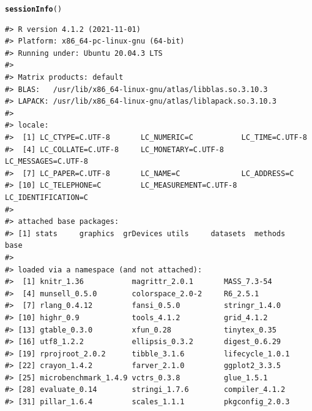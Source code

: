 \documentclass{article}\usepackage[]{graphicx}\usepackage[]{color}
\makeatletter
\newcommand{\hlstd}[1]{\textcolor[rgb]{0.345,0.345,0.345}{#1}}%
\newcommand{\hlkwd}[1]{\textcolor[rgb]{0.737,0.353,0.396}{\textbf{#1}}}%
\newenvironment{kframe}{%
 \def\at@end@of@kframe{}%
 \ifinner\ifhmode%
  \def\at@end@of@kframe{\end{minipage}}%
  \begin{minipage}{\columnwidth}%
 \fi\fi%
 \def\FrameCommand##1{\hskip\@totalleftmargin \hskip-\fboxsep
 \colorbox{shadecolor}{##1}\hskip-\fboxsep
     \hskip-\linewidth \hskip-\@totalleftmargin \hskip\columnwidth}%
 \MakeFramed {\advance\hsize-\width
   \@totalleftmargin\z@ \linewidth\hsize
   \@setminipage}}%
 {\par\unskip\endMakeFramed%
 \at@end@of@kframe}
\newenvironment{knitrout}{}{} %
\makeatother
\begin{document}
\begin{knitrout}
\color{fgcolor}\begin{kframe}
\begin{alltt}
\hlkwd{sessionInfo}\hlstd{()}
\end{alltt}
\begin{verbatim}
#> R version 4.1.2 (2021-11-01)
#> Platform: x86_64-pc-linux-gnu (64-bit)
#> Running under: Ubuntu 20.04.3 LTS
#> 
#> Matrix products: default
#> BLAS:   /usr/lib/x86_64-linux-gnu/atlas/libblas.so.3.10.3
#> LAPACK: /usr/lib/x86_64-linux-gnu/atlas/liblapack.so.3.10.3
#> 
#> locale:
#>  [1] LC_CTYPE=C.UTF-8       LC_NUMERIC=C           LC_TIME=C.UTF-8       
#>  [4] LC_COLLATE=C.UTF-8     LC_MONETARY=C.UTF-8    LC_MESSAGES=C.UTF-8   
#>  [7] LC_PAPER=C.UTF-8       LC_NAME=C              LC_ADDRESS=C          
#> [10] LC_TELEPHONE=C         LC_MEASUREMENT=C.UTF-8 LC_IDENTIFICATION=C   
#> 
#> attached base packages:
#> [1] stats     graphics  grDevices utils     datasets  methods   base     
#> 
#> loaded via a namespace (and not attached):
#>  [1] knitr_1.36           magrittr_2.0.1       MASS_7.3-54         
#>  [4] munsell_0.5.0        colorspace_2.0-2     R6_2.5.1            
#>  [7] rlang_0.4.12         fansi_0.5.0          stringr_1.4.0       
#> [10] highr_0.9            tools_4.1.2          grid_4.1.2          
#> [13] gtable_0.3.0         xfun_0.28            tinytex_0.35        
#> [16] utf8_1.2.2           ellipsis_0.3.2       digest_0.6.29       
#> [19] rprojroot_2.0.2      tibble_3.1.6         lifecycle_1.0.1     
#> [22] crayon_1.4.2         farver_2.1.0         ggplot2_3.3.5       
#> [25] microbenchmark_1.4.9 vctrs_0.3.8          glue_1.5.1          
#> [28] evaluate_0.14        stringi_1.7.6        compiler_4.1.2      
#> [31] pillar_1.6.4         scales_1.1.1         pkgconfig_2.0.3
\end{verbatim}
\end{kframe}
\end{knitrout}

\nocite{R-2021}

\printbibliography
\end{document}
